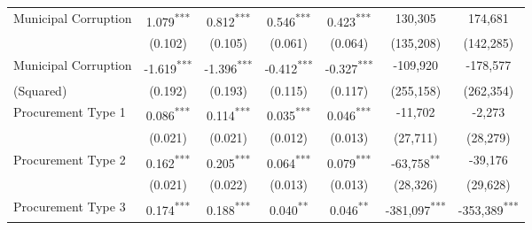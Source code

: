 \documentclass[11pt]{article}
\newcommand\T{\rule{0pt}{2.6ex}}       %
\newcommand\B{\rule[-1.2ex]{0pt}{0pt}} %
\begin{document}
\begin{table}[!htbp]
\begin{tabular}{l@{\extracolsep{4pt}}ccccc@{\extracolsep{4pt}}c}
   Municipal Corruption            & 1.079\textsuperscript{***}         & 0.812\textsuperscript{***}         & 0.546\textsuperscript{***}         & 0.423\textsuperscript{***}         & 130,305                           & 174,681                             \T \B \\
                                   & (0.102)                            & (0.105)                            & (0.061)                            & (0.064)                            & (135,208)                         & (142,285)                           \T \B \\
   Municipal Corruption            & -1.619\textsuperscript{***}        & -1.396\textsuperscript{***}        & -0.412\textsuperscript{***}        & -0.327\textsuperscript{***}        & -109,920                          & -178,577                            \T \B \\
   \footnotesize{(Squared)}        & (0.192)                            & (0.193)                            & (0.115)                            & (0.117)                            & (255,158)                         & (262,354)                           \T \B \\
   Procurement Type 1              & 0.086\textsuperscript{***}         & 0.114\textsuperscript{***}         & 0.035\textsuperscript{***}         & 0.046\textsuperscript{***}         & -11,702                           & -2,273                              \T \B \\
                                   & (0.021)                            & (0.021)                            & (0.012)                            & (0.013)                            & (27,711)                          & (28,279)                            \T \B \\
   Procurement Type 2              & 0.162\textsuperscript{***}         & 0.205\textsuperscript{***}         & 0.064\textsuperscript{***}         & 0.079\textsuperscript{***}         & -63,758\textsuperscript{**}       & -39,176                             \T \B \\
                                   & (0.021)                            & (0.022)                            & (0.013)                            & (0.013)                            & (28,326)                          & (29,628)                            \T \B \\
   Procurement Type 3              & 0.174\textsuperscript{***}         & 0.188\textsuperscript{***}         & 0.040\textsuperscript{**}          & 0.046\textsuperscript{**}          & -381,097\textsuperscript{***}     & -353,389\textsuperscript{***}       \T \B \\

\end{tabular}
\end{table}
\end{document}
